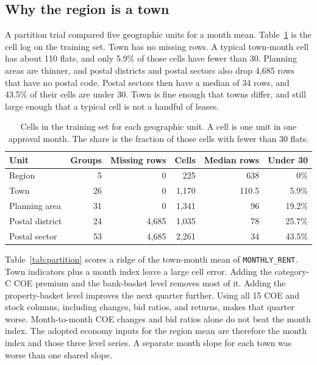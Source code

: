 \documentclass[11pt]{article}
\begin{document}
\subsection{Why the region is a town}

A partition trial compared five geographic units for a month mean.
Table~\ref{tab:cells} is the cell log on the training set.
Town has no missing rows.
A typical town-month cell has about 110 flats, and only 5.9\% of those cells have fewer than 30.
Planning areas are thinner, and postal districts and postal sectors also drop 4{,}685 rows that have no postal code.
Postal sectors then have a median of 34 rows, and 43.5\% of their cells are under 30.
Town is fine enough that towns differ, and still large enough that a typical cell is not a handful of leases.

\begin{table}[ht]
\centering
\caption{Cells in the training set for each geographic unit.
A cell is one unit in one approval month.
The share is the fraction of those cells with fewer than 30 flats.}
\label{tab:cells}
\begin{tabular}{lrrrrr}
\toprule
Unit & Groups & Missing rows & Cells & Median rows & Under 30 \\
\midrule
Region & 5 & 0 & 225 & 638 & 0\% \\
Town & 26 & 0 & 1{,}170 & 110.5 & 5.9\% \\
Planning area & 31 & 0 & 1{,}341 & 96 & 19.2\% \\
Postal district & 24 & 4{,}685 & 1{,}035 & 78 & 25.7\% \\
Postal sector & 53 & 4{,}685 & 2{,}261 & 34 & 43.5\% \\
\bottomrule
\end{tabular}
\end{table}

Table~\ref{tab:partition} scores a ridge of the town-month mean of \texttt{MONTHLY\_RENT}.
Town indicators plus a month index leave a large cell error.
Adding the category-C COE premium and the bank-basket level removes most of it.
Adding the property-basket level improves the next quarter further.
Using all 15 COE and stock columns, including changes, bid ratios, and returns, makes that quarter worse.
Month-to-month COE changes and bid ratios alone do not beat the month index.
The adopted economy inputs for the region mean are therefore the month index and those three level series.
A separate month slope for each town was worse than one shared slope.
\end{document}
